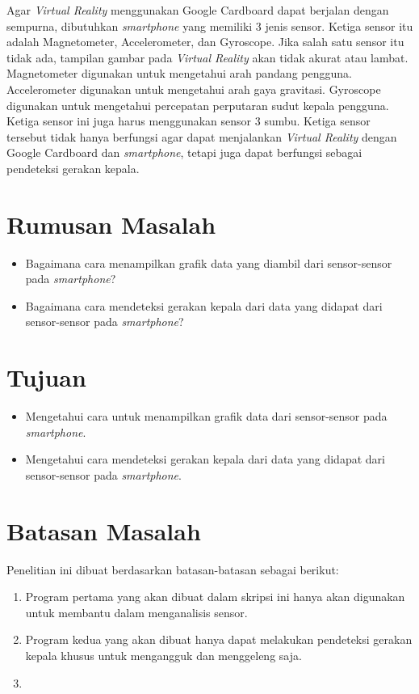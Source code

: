 Agar \textit{Virtual Reality} menggunakan Google Cardboard dapat berjalan dengan sempurna, dibutuhkan \textit{smartphone} yang memiliki 3 jenis sensor. Ketiga sensor itu adalah Magnetometer, Accelerometer, dan Gyroscope.\cite{android_open_source_project} Jika salah satu sensor itu tidak ada, tampilan gambar pada \textit{Virtual Reality} akan tidak akurat atau lambat. Magnetometer digunakan untuk mengetahui arah pandang pengguna. Accelerometer digunakan untuk mengetahui arah gaya gravitasi.\cite{bleser2009advanced} Gyroscope digunakan untuk mengetahui percepatan perputaran sudut kepala pengguna. Ketiga sensor ini juga harus menggunakan sensor 3 sumbu. Ketiga sensor tersebut tidak hanya berfungsi agar dapat menjalankan \textit{Virtual Reality} dengan Google Cardboard dan \textit{smartphone}, tetapi juga dapat berfungsi sebagai pendeteksi gerakan kepala.
\section{Rumusan Masalah}

\begin{itemize}
	\item Bagaimana cara menampilkan grafik data yang diambil dari sensor-sensor pada \textit{smartphone}?
	\item Bagaimana cara mendeteksi gerakan kepala dari data yang didapat dari sensor-sensor pada \textit{smartphone}?
\end{itemize}

\section{Tujuan}

\begin{itemize}
	\item Mengetahui cara untuk menampilkan grafik data dari sensor-sensor pada \textit{smartphone}.
	\item Mengetahui cara mendeteksi gerakan kepala dari data yang didapat dari sensor-sensor pada \textit{smartphone}.
\end{itemize}

\section{Batasan Masalah}

Penelitian ini dibuat berdasarkan batasan-batasan sebagai berikut: 
\begin{enumerate}
	\item Program pertama yang akan dibuat dalam skripsi ini hanya akan digunakan untuk membantu dalam menganalisis sensor.
	\item Program kedua yang akan dibuat hanya dapat melakukan pendeteksi gerakan kepala khusus untuk mengangguk dan menggeleng saja.
	\item 
\end{enumerate}

